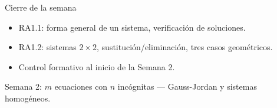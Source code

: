 \documentclass[11pt]{beamer}
\begin{document}
\begin{frame}{Cierre de la semana}
  \begin{itemize}
    \item RA1.1: forma general de un sistema, verificación de soluciones.
    \item RA1.2: sistemas $2\times 2$, sustitución/eliminación, tres casos geométricos.
    \item Control formativo al inicio de la Semana 2.
  \end{itemize}
  \vfill
  \centering \Large Semana 2: $m$ ecuaciones con $n$ incógnitas --- Gauss-Jordan y sistemas
  homogéneos.
\end{frame}
\end{document}
